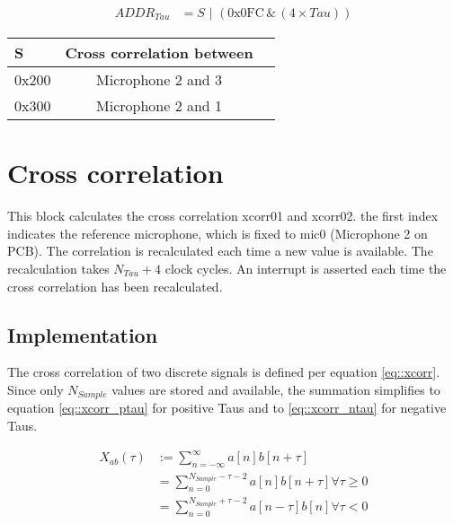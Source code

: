 \begin{align}
	ADDR_{Tau} &= S\,\,|\,\, (\text{0x0FC}\, \&\, (4\times Tau)) \label{eq:addr_calc}
\end{align}

\begin{table}[h]
	\centering
	\label{tbl::tau_addr}
	\begin{tabular}{|l|c|l|}
		\hline 
		S &  Cross correlation between \\
		\hline 
		0x200	&  Microphone 2 and 3\\
		\hline 
		0x300	&  Microphone 2 and 1\\
		\hline 
	\end{tabular} 
\end{table}

\section{Cross correlation}
\label{sec::cic}
This block calculates the cross correlation xcorr01 and xcorr02.
the first index indicates the reference microphone, which is fixed to mic0 (Microphone 2 on PCB).
The correlation is recalculated each time a new value is available.
The recalculation takes $N_{Tau}+4$ clock cycles.
An interrupt is asserted each time the cross correlation has been recalculated.

\subsection{Implementation}
The cross correlation of two discrete signals is defined per equation \ref{eq::xcorr}.
Since only $N_{Sample}$ values are stored and available, the summation simplifies to equation \ref{eq::xcorr_ptau} for positive Taus and to \ref{eq::xcorr_ntau} for negative Taus.

\begin{align}
X_{ab}(\tau) &:= \sum_{n=-\infty}^{\infty}a\left[n\right]b\left[n+\tau\right] \label{eq::xcorr}\\
&= \sum_{n=0}^{N_{Sample}-\tau-2}a\left[n\right]b\left[n+\tau\right] \forall\tau\ge0 \label{eq::xcorr_ptau} \\
&= \sum_{n=0}^{N_{Sample}+\tau-2}a\left[n-\tau\right]b\left[n\right] \forall\tau<0 \label{eq::xcorr_ntau} \\	
\end{align}

